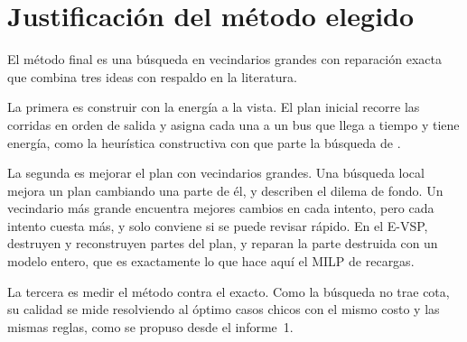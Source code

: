 \section{Justificación del método elegido}
\label{sec:justificacion}

El método final es una búsqueda en vecindarios grandes con reparación exacta que combina tres ideas con respaldo en la literatura.

La primera es construir con la energía a la vista. El plan inicial recorre las corridas en orden de salida y asigna cada una a un bus que llega a tiempo y tiene energía, como la heurística constructiva con que parte la búsqueda de .

La segunda es mejorar el plan con vecindarios grandes. Una búsqueda local mejora un plan cambiando una parte de él, y  describen el dilema de fondo. Un vecindario más grande encuentra mejores cambios en cada intento, pero cada intento cuesta más, y solo conviene si se puede revisar rápido. En el E-VSP,  destruyen y reconstruyen partes del plan, y  reparan la parte destruida con un modelo entero, que es exactamente lo que hace aquí el MILP de recargas.

La tercera es medir el método contra el exacto. Como la búsqueda no trae cota, su calidad se mide resolviendo al óptimo casos chicos con el mismo costo y las mismas reglas, como se propuso desde el informe~1.
